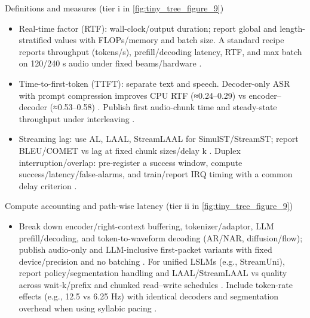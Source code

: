 Definitions and measures (tier i in \autoref{fig:tiny_tree_figure_9})
\begin{itemize}
  \item Real-time factor (RTF): wall-clock/output duration; report global and length-stratified values with FLOPs/memory and batch size. A standard recipe reports throughput (tokens/s), prefill/decoding latency, RTF, and max batch on 120/240 s audio under fixed beams/hardware \cite{lu2024fastadaspmultitaskadaptedefficientinfere}.
  \item Time-to-first-token (TTFT): separate text and speech. Decoder-only ASR with prompt compression improves CPU RTF (≈0.24–0.29) vs encoder–decoder (≈0.53–0.58) \cite{tsunoo2024decoderonlyarchitecturespeechrecognition}. Publish first audio-chunk time and steady-state throughput under interleaving \cite{lu2024fastadaspmultitaskadaptedefficientinfere}.
  \item Streaming lag: use AL, LAAL, StreamLAAL for SimulST/StreamST; report BLEU/COMET vs lag at fixed chunk sizes/delay k \cite{guo2025streamuniachievingstreamingspeechtransla}. Duplex interruption/overlap: pre-register a success window, compute success/latency/false-alarms, and train/report IRQ timing with a common delay criterion \cite{ma2024languagemodelcanlistenwhilespeaking}.
\end{itemize}

Compute accounting and path-wise latency (tier ii in \autoref{fig:tiny_tree_figure_9})
\begin{itemize}
  \item Break down encoder/right-context buffering, tokenizer/adaptor, LLM prefill/decoding, and token-to-waveform decoding (AR/NAR, diffusion/flow); publish audio-only and LLM-inclusive first-packet variants with fixed device/precision and no batching \cite{entry2025indicsuperbspeechprocessinguniversalperf,vashishth2024stabspeechtokenizerassessmentbenchmark}. For unified LSLMs (e.g., StreamUni), report policy/segmentation handling and LAAL/StreamLAAL vs quality across wait‑k/prefix and chunked read–write schedules \cite{guo2025streamuniachievingstreamingspeechtransla}. Include token-rate effects (e.g., 12.5 vs 6.25 Hz) with identical decoders and segmentation overhead when using syllabic pacing \cite{baade2024syllablelmlearningcoarsesemanticunitsspe}.
\end{itemize}

